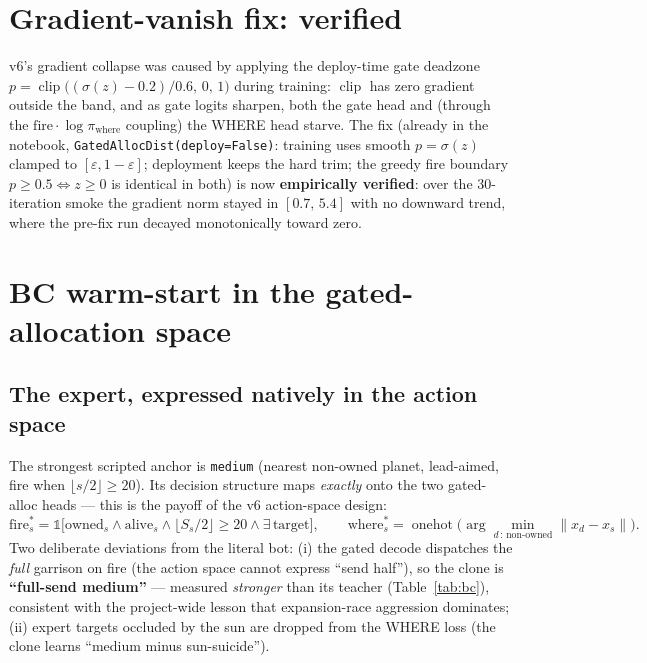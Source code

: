 \documentclass[11pt]{article}
\newcommand{\clip}{\operatorname{clip}}
\newcommand{\cd}[1]{\texttt{#1}}
\begin{document}
\section{Gradient-vanish fix: verified}\label{v7:grad}

v6's gradient collapse was caused by applying the deploy-time gate deadzone
$p = \clip\!\big((\sigma(z)-0.2)/0.6,\,0,\,1\big)$ during training: $\clip$ has zero gradient
outside the band, and as gate logits sharpen, both the gate head and (through the
$\mathrm{fire}\cdot\log\pi_{\text{where}}$ coupling) the WHERE head starve. The fix (already in the
notebook, \cd{GatedAllocDist(deploy=False)}: training uses smooth $p=\sigma(z)$ clamped to
$[\varepsilon,1-\varepsilon]$; deployment keeps the hard trim; the greedy fire boundary
$p\ge 0.5 \Leftrightarrow z\ge 0$ is identical in both) is now \textbf{empirically verified}: over
the 30-iteration smoke the gradient norm stayed in $[0.7,\,5.4]$ with no downward trend, where the
pre-fix run decayed monotonically toward zero.

\section{BC warm-start in the gated-allocation space}\label{v7:bc}

\subsection{The expert, expressed natively in the action space}
The strongest scripted anchor is \cd{medium} (nearest non-owned planet, lead-aimed, fire when
$\lfloor s/2\rfloor \ge 20$). Its decision structure maps \emph{exactly} onto the two gated-alloc
heads --- this is the payoff of the v6 action-space design:
\[
\text{fire}^\ast_{s} = \mathbb{1}\big[\text{owned}_s \wedge \text{alive}_s \wedge
\lfloor S_s/2\rfloor \ge 20 \wedge \exists\,\text{target}\big],
\qquad
\text{where}^\ast_{s} = \operatorname{onehot}\big(\arg\min_{d\,:\,\text{non-owned}} \|x_d - x_s\|\big).
\]
Two deliberate deviations from the literal bot: (i) the gated decode dispatches the \emph{full}
garrison on fire (the action space cannot express ``send half''), so the clone is
\textbf{``full-send medium''} --- measured \emph{stronger} than its teacher (Table~\ref{tab:bc}),
consistent with the project-wide lesson that expansion-race aggression dominates; (ii) expert
targets occluded by the sun are dropped from the WHERE loss (the clone learns
``medium minus sun-suicide'').
\end{document}
